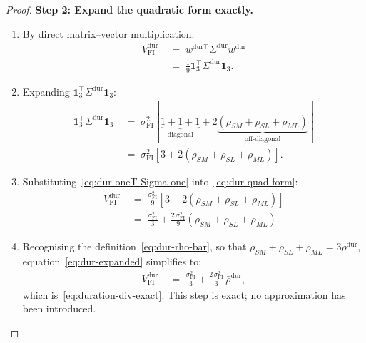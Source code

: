 \documentclass[12pt,openany]{book}
\newcommand{\bfw}{\mathbf{w}}
\newcommand{\bfone}{\mathbf{1}}
\numberwithin{equation}{chapter}
\theoremstyle{plain}
\theoremstyle{definition}
\theoremstyle{remark}
\def\bfw{w}%
\begin{document}
\begin{proof}
\medskip
\noindent\textbf{Step 2: Expand the quadratic form exactly.}

\begin{enumerate}
  \item By direct matrix--vector multiplication:
        \begin{align}
          V_{\mathrm{FI}}^{\mathrm{dur}}
          &\;=\; \bfw^{\mathrm{dur}\top}
                 \Sigma^{\mathrm{dur}}
                 \bfw^{\mathrm{dur}}
          \nonumber\\
          &\;=\; \frac{1}{9}
                 \bfone_3^\top
                 \Sigma^{\mathrm{dur}}
                 \bfone_3.
          \label{eq:dur-quad-form}
        \end{align}
  \item Expanding $\bfone_3^\top \Sigma^{\mathrm{dur}} \bfone_3$:
        \begin{align}
          \bfone_3^\top \Sigma^{\mathrm{dur}} \bfone_3
          &\;=\; \sigma_{\mathrm{FI}}^2\!\left[
                   \underbrace{1 + 1 + 1}_{\text{diagonal}}
                   + 2\!\underbrace{(\rho_{SM}
                     + \rho_{SL} + \rho_{ML})}_{\text{off-diagonal}}
                 \right]
          \nonumber\\
          &\;=\; \sigma_{\mathrm{FI}}^2\!\left[
                   3 + 2(\rho_{SM} + \rho_{SL} + \rho_{ML})
                 \right].
          \label{eq:dur-oneT-Sigma-one}
        \end{align}
  \item Substituting~\eqref{eq:dur-oneT-Sigma-one}
        into~\eqref{eq:dur-quad-form}:
        \begin{align}
          V_{\mathrm{FI}}^{\mathrm{dur}}
          &\;=\; \frac{\sigma_{\mathrm{FI}}^2}{9}
                 \left[3 + 2(\rho_{SM} + \rho_{SL} + \rho_{ML})
                 \right]
          \nonumber\\
          &\;=\; \frac{\sigma_{\mathrm{FI}}^2}{3}
                 + \frac{2\,\sigma_{\mathrm{FI}}^2}{9}
                   (\rho_{SM} + \rho_{SL} + \rho_{ML}).
          \label{eq:dur-expanded}
        \end{align}
  \item Recognising the definition~\eqref{eq:dur-rho-bar},
        so that $\rho_{SM} + \rho_{SL} + \rho_{ML}
        = 3\bar{\rho}^{\mathrm{dur}}$,
        equation~\eqref{eq:dur-expanded} simplifies to:
        \begin{align}
          V_{\mathrm{FI}}^{\mathrm{dur}}
          &\;=\; \frac{\sigma_{\mathrm{FI}}^2}{3}
                 + \frac{2\,\sigma_{\mathrm{FI}}^2}{3}
                   \,\bar{\rho}^{\mathrm{dur}},
          \label{eq:dur-exact-rhobar}
        \end{align}
        which is~\eqref{eq:duration-div-exact}.  This step is
        exact; no approximation has been introduced.
\end{enumerate}


\end{proof}
\end{document}
